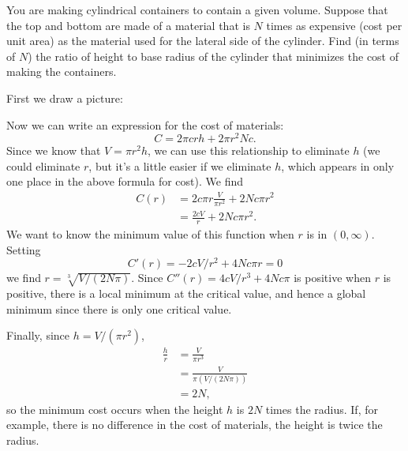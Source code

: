 \documentclass{ximera}
\begin{document}
\begin{example}
You are making cylindrical containers to contain a given volume.  Suppose
that the top and bottom are made of a material that is $N$ times as
expensive (cost per unit area) as the material used for the lateral side of
the cylinder.  Find (in terms of $N$) the ratio of height to base radius of
the cylinder that minimizes the cost of making the containers.
\begin{explanation}
  First we draw a picture:
\begin{image}
\end{image}
  Now we can write an expression for the cost of materials:
  \[
  C = 2\pi crh+2\pi r^2Nc.
  \]
  Since we know that $V=\pi r^2h$, we can use this relationship to
  eliminate $h$ (we could eliminate $r$, but it's a little easier if we
  eliminate $h$, which appears in only one place in the above formula
  for cost).  We find
\begin{align*}
  C(r)&=2c\pi r\frac{V}{\pi r^2}+2Nc\pi r^2\\
  &=\frac{2cV}{r}+2Nc\pi r^2.
\end{align*}
We want to know the minimum value of this function when $r$ is in
$(0,\infty)$. Setting
\[
C'(r)=-2cV/r^2+4Nc\pi r =0
\]
we find $r=\sqrt[3]{V/(2N\pi)}$.  Since $C''(r)=4cV/r^3+4Nc\pi$ is
positive when $r$ is positive, there is a local minimum at the
critical value, and hence a global minimum since there is only one
critical value.

Finally, since $h=V/(\pi r^2)$, 
\begin{align*}
\frac{h}{r}&=\frac{V}{\pi r^3}\\ 
&=\frac{V}{\pi(V/(2N\pi))}\\ 
&=2N,
\end{align*}
so the minimum cost occurs when the height $h$ is $2N$ times the
radius. If, for example, there is no difference in the cost of
materials, the height is twice the radius.
\end{explanation}
\end{example}
\end{document}
